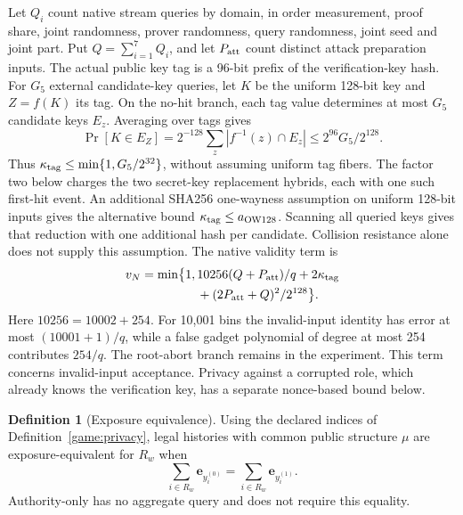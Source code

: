 \documentclass[conference,compsoc]{IEEEtran}
\theoremstyle{definition}
\newtheorem{definition}{Definition}[section]
\newtheorem{definition}{Definition}
\numberwithin{equation}{section}
\numberwithin{table}{section}
\numberwithin{figure}{section}
\theoremstyle{plain}
\begin{document}
Let \(Q_i\) count native stream queries by domain, in order measurement,
proof share, joint randomness, prover randomness, query randomness, joint
seed and joint part. Put \(Q=\sum_{i=1}^{7}Q_i\), and let \(P_{\rm att}\)
count distinct attack preparation inputs. The actual public key tag is a
96-bit prefix of the verification-key hash. For \(G_5\) external candidate-key
queries, let \(K\) be the uniform 128-bit key and \(Z=f(K)\) its tag.
On the no-hit branch, each tag value determines at most \(G_5\) candidate
keys \(E_z\). Averaging over tags gives
\[
 \Pr[K\in E_Z]=2^{-128}\sum_z|f^{-1}(z)\cap E_z|
 \le 2^{96}G_5/2^{128}.
\]
Thus \(\kappa_{\rm tag}\le\min\{1,G_5/2^{32}\}\), without assuming
uniform tag fibers. The factor two below charges the two secret-key
replacement hybrids, each with one such first-hit event.
An additional SHA256 one-wayness assumption on uniform 128-bit inputs gives
the alternative bound \(\kappa_{\rm tag}\le a_{\rm OW128}\).
Scanning all queried keys gives that reduction with one additional hash per
candidate. Collision resistance alone does not supply this assumption.
The native validity term is
\begin{equation}
 \begin{split}
 v_N=\min\bigl\{1,{}&10256(Q+P_{\rm att})/q+2\kappa_{\rm tag}\\
                   &+(2P_{\rm att}+Q)^2/2^{128}\bigr\}.
 \end{split}
 \label{eq:native-validity-bound}
\end{equation}
Here \(10256=10002+254\). For 10,001 bins the invalid-input identity
has error at most \((10001+1)/q\), while a false gadget polynomial of
degree at most 254 contributes \(254/q\). The root-abort branch remains
in the experiment. This term concerns invalid-input acceptance. Privacy against a corrupted
role, which already knows the verification key, has a separate nonce-based
bound below.

\begin{definition}[Exposure equivalence]
\label{def:exposure-equivalence}
Using the declared indices of Definition~\ref{game:privacy}, legal histories
with common public structure \(\mu\) are exposure-equivalent for \(R_w\) when
\begin{equation}
 \sum_{i\in R_w}\mathbf e_{y_i^{(0)}}=
 \sum_{i\in R_w}\mathbf e_{y_i^{(1)}}.
 \label{eq:exposure-equivalence}
\end{equation}
Authority-only has no aggregate query and does not require this equality.
\end{definition}
\end{document}
